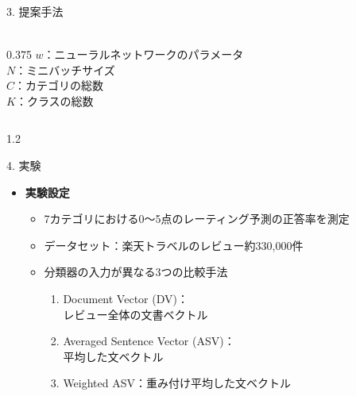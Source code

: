\documentclass[unicode,10pt]{beamer}
\newlength{\mycolumnwidth}
\newcommand{\itemtitle}[1]{\textbf{#1}\\}
\begin{document}
\begin{frame}
\begin{block}{3. 提案手法}
\begin{columns}[onlytextwidth,t]
\begin{column}{\mycolumnwidth}
\begin{itemize}
{\begin{gather*}
              \nonumber
            \end{gather*}
          }{0.375\linewidth}{
            \small
            $w$：ニューラルネットワークのパラメータ \\
            $N$：ミニバッチサイズ \\
            $C$：カテゴリの総数 \\
            $K$：クラスの総数 \\
          }
      \end{itemize}
    \end{column}
  \end{columns}
\end{block}

\begin{columns}[onlytextwidth,t]
  \begin{column}{1.2\mycolumnwidth}
    \begin{block}{4. 実験}
      \begin{itemize}
        \item \itemtitle{実験設定}
          \begin{itemize}
            \item 7カテゴリにおける0〜5点のレーティング予測の正答率を測定
            \item データセット：楽天トラベルのレビュー約330,000件
            \item 分類器の入力が異なる3つの比較手法
              \begin{enumerate}
                \item Document Vector (DV)：\\レビュー全体の文書ベクトル
                \item Averaged Sentence Vector (ASV)：\\平均した文ベクトル
                \item Weighted ASV：重み付け平均した文ベクトル
              \end{enumerate}
          \end{itemize}
      \end{itemize}


\end{block}
\end{column}
\end{columns}
\end{frame}
\end{document}
